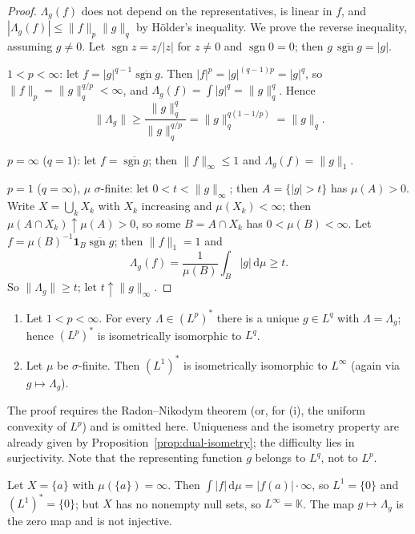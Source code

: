 \documentclass[11pt]{article}
\newcommand{\K}{\mathbb{K}}
\newcommand{\norm}[1]{\lVert #1\rVert}
\newcommand{\dmu}{\,\mathrm{d}\mu}
\newcommand{\ind}{\mathbf{1}}
\DeclareMathOperator{\sgn}{sgn}
\begin{document}
\begin{proof}
$\Lambda_{g}(f)$ does not depend on the representatives, is linear in $f$, and $|\Lambda_{g}(f)|\le\norm{f}_{p}\norm{g}_{q}$ by Hölder's inequality. We prove the reverse inequality, assuming $g\ne0$. Let $\sgn z=z/|z|$ for $z\ne0$ and $\sgn0=0$; then $g\,\overline{\sgn g}=|g|$.

$1<p<\infty$: let $f=|g|^{q-1}\overline{\sgn g}$. Then $|f|^{p}=|g|^{(q-1)p}=|g|^{q}$, so $\norm{f}_{p}=\norm{g}_{q}^{q/p}<\infty$, and $\Lambda_{g}(f)=\int|g|^{q}=\norm{g}_{q}^{q}$. Hence
\[
\norm{\Lambda_{g}}\ge\frac{\norm{g}_{q}^{q}}{\norm{g}_{q}^{q/p}}=\norm{g}_{q}^{q(1-1/p)}=\norm{g}_{q}.
\]

$p=\infty$ ($q=1$): let $f=\overline{\sgn g}$; then $\norm{f}_{\infty}\le1$ and $\Lambda_{g}(f)=\norm{g}_{1}$.

$p=1$ ($q=\infty$), $\mu$ $\sigma$-finite: let $0<t<\norm{g}_{\infty}$; then $A=\{|g|>t\}$ has $\mu(A)>0$. Write $X=\bigcup_{k}X_{k}$ with $X_{k}$ increasing and $\mu(X_{k})<\infty$; then $\mu(A\cap X_{k})\uparrow\mu(A)>0$, so some $B=A\cap X_{k}$ has $0<\mu(B)<\infty$. Let $f=\mu(B)^{-1}\ind_{B}\overline{\sgn g}$; then $\norm{f}_{1}=1$ and
\[
\Lambda_{g}(f)=\frac{1}{\mu(B)}\int_{B}|g|\dmu\ge t .
\]
So $\norm{\Lambda_{g}}\ge t$; let $t\uparrow\norm{g}_{\infty}$.
\end{proof}

\begin{theorem}\label{thm:riesz-rep}
\begin{enumerate}
\item Let $1<p<\infty$. For every $\Lambda\in(L^{p})^{*}$ there is a unique $g\in L^{q}$ with $\Lambda=\Lambda_{g}$; hence $(L^{p})^{*}$ is isometrically isomorphic to $L^{q}$.
\item Let $\mu$ be $\sigma$-finite. Then $(L^{1})^{*}$ is isometrically isomorphic to $L^{\infty}$ (again via $g\mapsto\Lambda_{g}$).
\end{enumerate}
\end{theorem}

The proof requires the Radon--Nikodym theorem (or, for (i), the uniform convexity of $L^{p}$) and is omitted here. Uniqueness and the isometry property are already given by Proposition~\ref{prop:dual-isometry}; the difficulty lies in surjectivity. Note that the representing function $g$ belongs to $L^{q}$, not to $L^{p}$.

\begin{example}\label{ex:non-sigma}
Let $X=\{a\}$ with $\mu(\{a\})=\infty$. Then $\int|f|\dmu=|f(a)|\cdot\infty$, so $L^{1}=\{0\}$ and $(L^{1})^{*}=\{0\}$; but $X$ has no nonempty null sets, so $L^{\infty}=\K$. The map $g\mapsto\Lambda_{g}$ is the zero map and is not injective.
\end{example}
\end{document}
